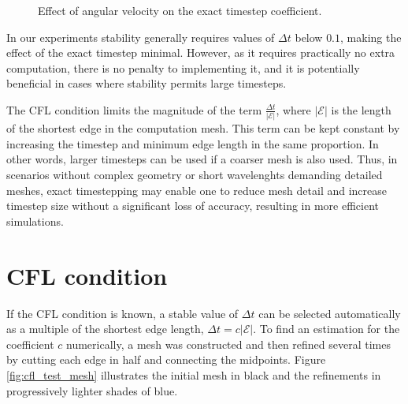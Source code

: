 \documentclass[utf8,english]{gradu3}
\begin{document}
\begin{figure}[h]
  \centering
  \caption{Effect of angular velocity on the exact timestep coefficient.}
  \label{fig:exact_coef_comparison}
\end{figure}

In our experiments stability generally requires values of $\Delta t$ below $0.1$,
making the effect of the exact timestep minimal.
However, as it requires practically no extra computation,
there is no penalty to implementing it,
and it is potentially beneficial in cases
where stability permits large timesteps.

The CFL condition limits the magnitude of the term $\frac{\Delta t}{|\mathcal{E}|}$,
where $|\mathcal{E}|$ is the length of the shortest edge in the computation mesh.
This term can be kept constant by increasing the timestep and minimum edge length
in the same proportion.
In other words, larger timesteps can be used if a coarser mesh is also used.
Thus, in scenarios without complex geometry or short wavelenghts
demanding detailed meshes,
exact timestepping may enable
one to reduce mesh detail and increase timestep size
without a significant loss of accuracy,
resulting in more efficient simulations.

\section{CFL condition}

If the CFL condition is known,
a stable value of $\Delta t$ can be selected automatically
as a multiple of the shortest edge length, $\Delta t = c|\mathcal{E}|$.
To find an estimation for the coefficient $c$ numerically,
a mesh was constructed and then refined several times 
by cutting each edge in half and connecting the midpoints.
Figure \ref{fig:cfl_test_mesh} illustrates the initial mesh in black
and the refinements in progressively lighter shades of blue.
\end{document}
